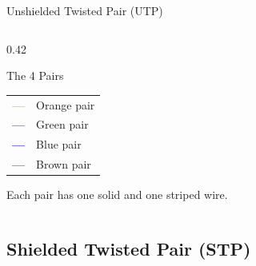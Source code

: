 \documentclass[aspectratio=169]{beamer}  %
\begin{document}
\begin{frame}[t,shrink=12]{Unshielded Twisted Pair (UTP)}
\begin{columns}[T]
\begin{column}{0.42\textwidth}
            \vspace{0.5em}
            \begin{block}{The 4 Pairs}
                \centering
                \small
                \begin{tabular}{c l}
                    \textcolor{orange}{\textbf{---}} & Orange pair \\
                    \textcolor{green}{\textbf{---}} & Green pair \\
                    \textcolor{blue}{\textbf{---}} & Blue pair \\
                    \textcolor{brown}{\textbf{---}} & Brown pair \\
                \end{tabular}
                
                \vspace{0.3em}
                Each pair has one solid and one striped wire.
            \end{block}
        \end{column}
    \end{columns}
\end{frame}

\subsection{Shielded Twisted Pair (STP)}

\end{document}
